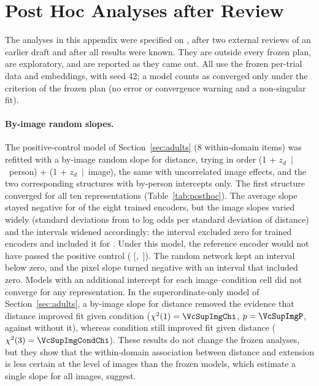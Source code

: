 
\clearpage
\section{Post Hoc Analyses after Review}
\label{app:posthoc}

The analyses in this appendix were specified on \VcPosthocDate, after two external reviews of an earlier draft and after all results were known. They are outside every frozen plan, are exploratory, and are reported as they came out. All use the frozen per-trial data and embeddings, with seed 42; a model counts as converged only under the criterion of the frozen plan (no error or convergence warning and a non-singular fit).

\paragraph{By-image random slopes.} The positive-control model of Section~\ref{sec:adults} (8 within-domain items) was refitted with a by-image random slope for distance, trying in order (1 + $z_d$~$\mid$~person) + (1 + $z_d$~$\mid$~image), the same with uncorrelated image effects, and the two corresponding structures with by-person intercepts only. The first structure converged for all ten representations (Table~\ref{tab:posthoc}). The average slope stayed negative for \VcImgTrSameSignWord{} of the eight trained encoders, but the image slopes varied widely (standard deviations from \VcImgSdMin{} to \VcImgSdMax{} log odds per standard deviation of distance) and the intervals widened accordingly: the interval excluded zero for \VcImgTrExclWord{} trained encoders and included it for \VcImgTrInclList. Under this model, the reference encoder would not have passed the positive control (\VcImgRzB{} [\VcImgRzLo,~\VcImgRzHi]). The random network kept an interval below zero, and the pixel slope turned negative with an interval that included zero. Models with an additional intercept for each image--condition cell did not converge for any representation. In the superordinate-only model of Section~\ref{sec:adults}, a by-image slope for distance removed the evidence that distance improved fit given condition ($\chi^2(1) = \VcSupImgChi$, $p = \VcSupImgP$, against \VcSupFrozenDistChi{} without it), whereas condition still improved fit given distance ($\chi^2(3) = \VcSupImgCondChi$). These results do not change the frozen analyses, but they show that the within-domain association between distance and extension is less certain at the level of images than the frozen models, which estimate a single slope for all images, suggest.

